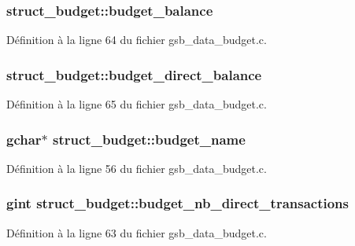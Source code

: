 \subsubsection[{budget\_\-balance}]{ {\bf struct\_\-budget::budget\_\-balance}}\label{structstruct__budget_a30f5550a362e585d0fca58ba929a4d22}


Définition à la ligne 64 du fichier gsb\_\-data\_\-budget.c.

\subsubsection[{budget\_\-direct\_\-balance}]{ {\bf struct\_\-budget::budget\_\-direct\_\-balance}}\label{structstruct__budget_af603281e91e1bd58a1d054a44c3c8d89}


Définition à la ligne 65 du fichier gsb\_\-data\_\-budget.c.

\subsubsection[{budget\_\-name}]{\setlength{\rightskip}{0pt plus 5cm}gchar$\ast$ {\bf struct\_\-budget::budget\_\-name}}\label{structstruct__budget_afe73a2a65fc4bfe3449c14d3f9a24e4a}


Définition à la ligne 56 du fichier gsb\_\-data\_\-budget.c.

\subsubsection[{budget\_\-nb\_\-direct\_\-transactions}]{\setlength{\rightskip}{0pt plus 5cm}gint {\bf struct\_\-budget::budget\_\-nb\_\-direct\_\-transactions}}\label{structstruct__budget_a37a1b4528b21a75a69daa4245cd5dded}


Définition à la ligne 63 du fichier gsb\_\-data\_\-budget.c.

